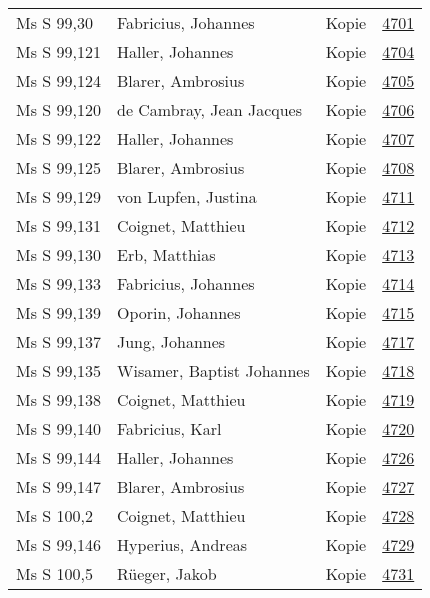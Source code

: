 \documentclass[10pt,a4paper,landscape]{report}
\begin{document}
\begin{longtable}{p{16cm}p{4cm}lr}
Ms S 99,30	&	Fabricius, Johannes	&	Kopie	&	\href{http://130.60.24.72/assignment/4701}{4701}\\
Ms S 99,121	&	Haller, Johannes	&	Kopie	&	\href{http://130.60.24.72/assignment/4704}{4704}\\
Ms S 99,124	&	Blarer, Ambrosius	&	Kopie	&	\href{http://130.60.24.72/assignment/4705}{4705}\\
Ms S 99,120	&	de Cambray, Jean Jacques	&	Kopie	&	\href{http://130.60.24.72/assignment/4706}{4706}\\
Ms S 99,122	&	Haller, Johannes	&	Kopie	&	\href{http://130.60.24.72/assignment/4707}{4707}\\
Ms S 99,125	&	Blarer, Ambrosius	&	Kopie	&	\href{http://130.60.24.72/assignment/4708}{4708}\\
Ms S 99,129	&	von Lupfen, Justina	&	Kopie	&	\href{http://130.60.24.72/assignment/4711}{4711}\\
Ms S 99,131	&	Coignet, Matthieu	&	Kopie	&	\href{http://130.60.24.72/assignment/4712}{4712}\\
Ms S 99,130	&	Erb, Matthias	&	Kopie	&	\href{http://130.60.24.72/assignment/4713}{4713}\\
Ms S 99,133	&	Fabricius, Johannes	&	Kopie	&	\href{http://130.60.24.72/assignment/4714}{4714}\\
Ms S 99,139	&	Oporin, Johannes	&	Kopie	&	\href{http://130.60.24.72/assignment/4715}{4715}\\
Ms S 99,137	&	Jung, Johannes	&	Kopie	&	\href{http://130.60.24.72/assignment/4717}{4717}\\
Ms S 99,135	&	Wisamer, Baptist Johannes	&	Kopie	&	\href{http://130.60.24.72/assignment/4718}{4718}\\
Ms S 99,138	&	Coignet, Matthieu	&	Kopie	&	\href{http://130.60.24.72/assignment/4719}{4719}\\
Ms S 99,140	&	Fabricius, Karl	&	Kopie	&	\href{http://130.60.24.72/assignment/4720}{4720}\\
Ms S 99,144	&	Haller, Johannes	&	Kopie	&	\href{http://130.60.24.72/assignment/4726}{4726}\\
Ms S 99,147	&	Blarer, Ambrosius	&	Kopie	&	\href{http://130.60.24.72/assignment/4727}{4727}\\
Ms S 100,2	&	Coignet, Matthieu	&	Kopie	&	\href{http://130.60.24.72/assignment/4728}{4728}\\
Ms S 99,146	&	Hyperius, Andreas	&	Kopie	&	\href{http://130.60.24.72/assignment/4729}{4729}\\
Ms S 100,5	&	Rüeger, Jakob	&	Kopie	&	\href{http://130.60.24.72/assignment/4731}{4731}\\

\end{longtable}
\end{document}
